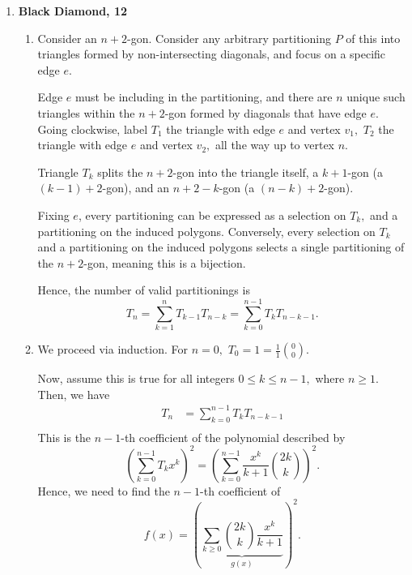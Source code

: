 \documentclass[12pt]{article}
\begin{document}
\begin{enumerate}
  \item \textbf{Black Diamond, 12}
    \begin{enumerate}
      \item Consider an $n + 2$-gon. Consider any arbitrary
        partitioning $P$ of this into triangles formed by
        non-intersecting diagonals, and focus on a specific edge $e.$

        Edge $e$ must be including in the partitioning, and there are
        $n$ unique such triangles within the $n + 2$-gon formed by
        diagonals that have edge $e.$ Going clockwise, label $T_1$
        the triangle with edge $e$ and vertex $v_1,$ $T_2$ the
        triangle with edge $e$ and vertex $v_2,$ all the way up to vertex $n.$

        Triangle $T_k$ splits the $n + 2$-gon into the triangle
        itself, a $k + 1$-gon (a $(k -1) + 2$-gon), and an $n + 2 -
        k$-gon (a $(n - k) + 2$-gon).

        Fixing $e$, every partitioning can be expressed as a
        selection on $T_k,$ and a partitioning on the induced
        polygons. Conversely, every selection on $T_k$ and a
        partitioning on the induced polygons selects a single
        partitioning of the $n + 2$-gon, meaning this is a bijection.

        Hence, the number of valid partitionings is
        $$
        T_n = \sum_{k = 1}^{n} T_{k - 1} T_{n - k } = \sum_{k = 0}^{n
        - 1} T_{k} T_{n - k -1}.
        $$

      \item We proceed via induction. For $n = 0,$ $T_0 = 1 =
        \frac{1}{1} {0 \choose 0}.$

        Now, assume this is true for all integers $0 \leq k \leq n -
        1,$ where $n \geq 1.$ Then, we have
        \begin{align*}
          T_n &= \sum_{k = 0}^{n-1}T_{k} T_{n - k - 1} \\
        \end{align*}
        This is the $n-1$-th coefficient of the polynomial described by
        $$
        \left(\sum_{k = 0}^{n-1} T_kx^k\right)^2 = \left( \sum_{k =
        0}^{n-1} \dfrac{x^k}{k + 1} {2k \choose k} \right)^2.
        $$
        Hence, we need to find the $n - 1$-th coefficient of
        $$
        f(x) = \left (\underbrace{\sum_{k \geq  0} {2k \choose k}
        \dfrac{x^k}{k + 1}}_{g(x)}\right)^2.
        $$


\end{enumerate}
\end{enumerate}
\end{document}
